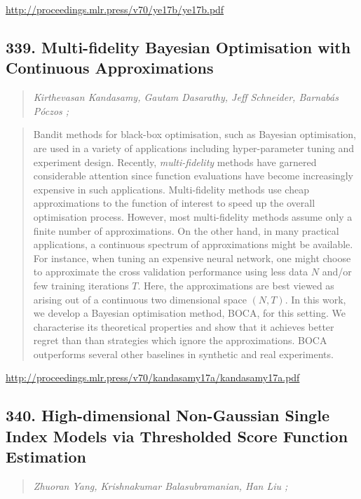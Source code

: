 \documentclass{article}
\begin{document}
\href{http://proceedings.mlr.press/v70/ye17b/ye17b.pdf}{http://proceedings.mlr.press/v70/ye17b/ye17b.pdf}

\subsection{339. Multi-fidelity Bayesian Optimisation with Continuous Approximations}

\begin{quote}
\footnotesize{\textit{Kirthevasan Kandasamy, Gautam Dasarathy, Jeff Schneider, Barnabás Póczos ;}}

\end{quote}

\begin{quote}
    Bandit methods for black-box optimisation, such as Bayesian optimisation, are used in a variety of applications including hyper-parameter tuning and experiment design. Recently, \textit{multi-fidelity} methods have garnered considerable attention since function evaluations have become increasingly expensive in such applications. Multi-fidelity methods use cheap approximations to the function of interest to speed up the overall optimisation process. However, most multi-fidelity methods assume only a finite number of approximations. On the other hand, in many practical applications, a continuous spectrum of approximations might be available. For instance, when tuning an expensive neural network, one might choose to approximate the cross validation performance using less data $N$ and/or few training iterations $T$. Here, the approximations are best viewed as arising out of a continuous two dimensional space $(N,T)$. In this work, we develop a Bayesian optimisation method, BOCA, for this setting. We characterise its theoretical properties and show that it achieves better regret than than strategies which ignore the approximations. BOCA outperforms several other baselines in synthetic and real experiments.  
\end{quote}

\href{http://proceedings.mlr.press/v70/kandasamy17a/kandasamy17a.pdf}{http://proceedings.mlr.press/v70/kandasamy17a/kandasamy17a.pdf}

\subsection{340. High-dimensional Non-Gaussian Single Index Models via Thresholded Score Function Estimation}

\begin{quote}
\footnotesize{\textit{Zhuoran Yang, Krishnakumar Balasubramanian, Han Liu ;}}

\end{quote}
\end{document}
